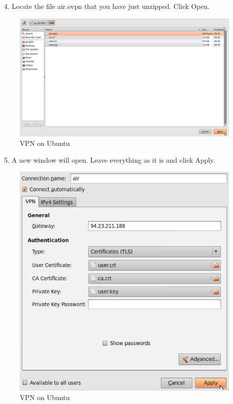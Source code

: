 \begin{enumerate}[1.]
\setcounter{enumi}{3}
\item
  Locate the file air.ovpn that you have just unzipped. Click Open.
\end{enumerate}
\begin{figure}[htbp]
\centering
\includegraphics{vpn_ubuntu_011.png}
\caption{VPN on Ubuntu}
\end{figure}

\begin{enumerate}[1.]
\setcounter{enumi}{4}
\item
  A new window will open. Leave everything as it is and click Apply.
\end{enumerate}
\begin{figure}[htbp]
\centering
\includegraphics{vpn_ubuntu_012.png}
\caption{VPN on Ubuntu}
\end{figure}

